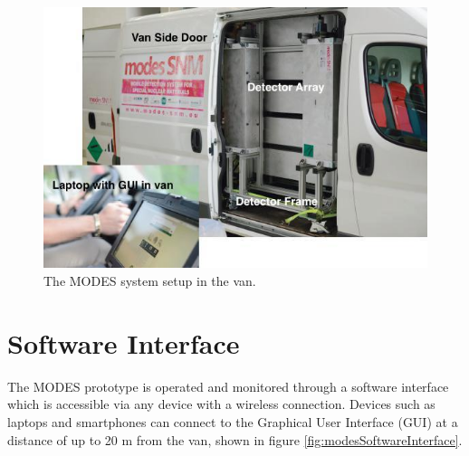 \begin{figure}
\begin{center}
\includegraphics[width=125mm]{./Chapter7/figures/MODESsetup.jpg}
\end{center}
\caption{The MODES system setup in the van.}
\label{fig:modesSetupInVan}
\end{figure}

\section{Software Interface}
The MODES prototype is operated and monitored through a software interface which is accessible via any device with a wireless connection. Devices such as laptops and smartphones can connect to the Graphical User Interface (GUI) at a distance of up to 20 m from the van, shown in figure \ref{fig:modesSoftwareInterface}. 

